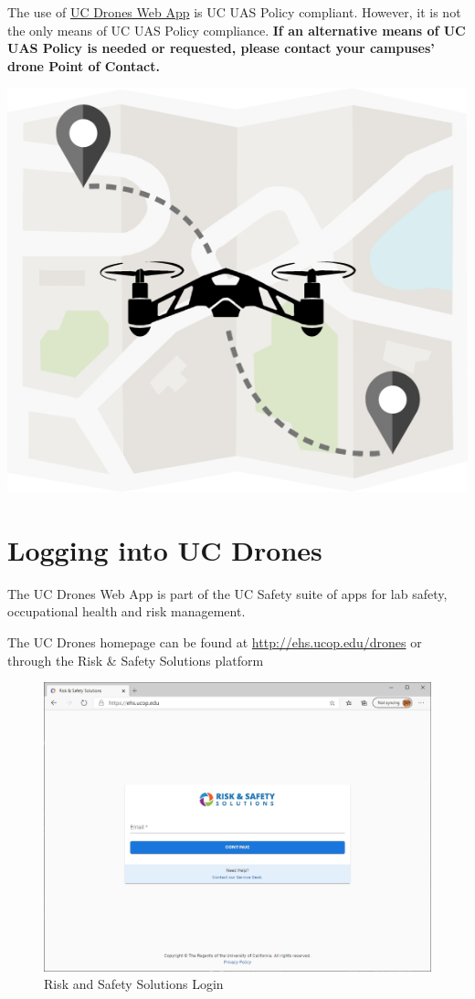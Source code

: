 \documentclass[
  12pt,
]{book}
\begin{document}
The use of \href{http://ehs.ucop.edu/drones}{UC Drones Web App} is UC UAS Policy compliant. However, it is not the only means of UC UAS Policy compliance. \textbf{If an alternative means of UC UAS Policy is needed or requested, please contact your campuses' drone Point of Contact.}

\href{http://ehs.ucop.edu/drones}{\includegraphics{images/UCDrones_logo.jpg}}

\section{Logging into UC Drones}\label{UCdrones-login}

The UC Drones Web App is part of the UC Safety suite of apps for lab safety, occupational health and risk management.

The UC Drones homepage can be found at \url{http://ehs.ucop.edu/drones} or through the Risk \& Safety Solutions platform

\begin{figure}

{\centering \includegraphics[width=0.85\linewidth]{images/RSS_home} 

}

\caption{Risk and Safety Solutions Login}\label{fig:rss-web}
\end{figure}
\end{document}
